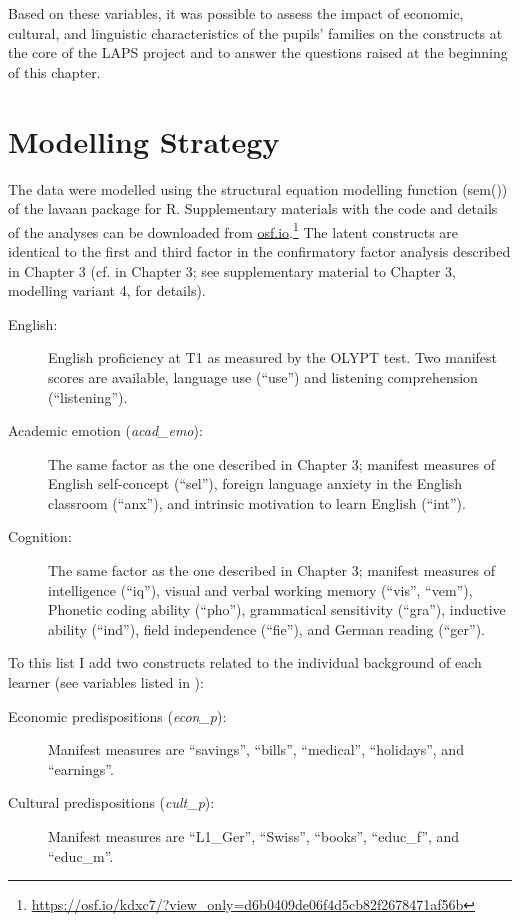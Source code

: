 \documentclass[output=paper]{langsci/langscibook}
\begin{document}
Based on these variables, it was possible to assess the impact of economic, cultural, and linguistic characteristics of the pupils’ families on the constructs at the core of the LAPS project and to answer the questions raised at the beginning of this chapter. 

\section{Modelling Strategy}

The data were modelled using the structural equation modelling function (sem()) of the lavaan package \citep{Rosseel2012} for R. Supplementary materials with the code and details of the analyses can be downloaded from \url{osf.io}.\footnote{\url{https://osf.io/kdxc7/?view_only=d6b0409de06f4d5cb82f2678471af56b}} The latent constructs are identical to the first and third factor in the confirmatory factor analysis described in Chapter 3 (cf.  in Chapter 3; see supplementary material to Chapter 3, modelling variant 4, for details). 

\begin{description}
\item[English:] English proficiency at T1 as measured by the OLYPT test. Two manifest scores are available, language use (``use'') and listening comprehension (``listening'').
\item[Academic emotion (\textit{acad\_emo}):] The same factor as the one described in Chapter 3; manifest measures of English self-concept (``sel''), foreign language anxiety in the English classroom (``anx''), and intrinsic motivation to learn English (``int'').
\item[Cognition:] The same factor as the one described in Chapter 3; manifest measures of intelligence (``iq''), visual and verbal working memory (``vis'', ``vem''), Phonetic coding ability (``pho''), grammatical sensitivity (``gra''), inductive ability (``ind''), field independence (``fie''), and German reading (``ger'').
\end{description}

To this list I add two constructs related to the individual background of each learner (see variables listed in ):

\begin{description}
\item[Economic predispositions (\textit{econ\_p}):] Manifest measures are ``savings'', ``bills'', ``medical'', ``holidays'', and ``earnings''.
\item[Cultural predispositions (\textit{cult\_p}):] Manifest measures are ``L1\_Ger'', ``Swiss'', ``books'', ``educ\_f'', and ``educ\_m''.
\end{description}
\end{document}
